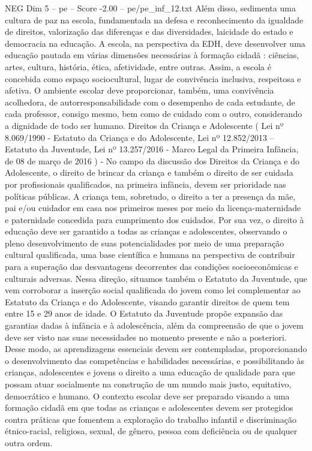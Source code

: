 \begin{textsample}{NEG Dim 5 – pe – Score -2.00 – pe/pe\_inf\_12.txt}
Além disso, sedimenta uma cultura de paz na escola, fundamentada na defesa e reconhecimento da igualdade de direitos, valorização das diferenças e das diversidades, laicidade do estado e democracia na educação.
A escola, na perspectiva da EDH, deve desenvolver uma educação pautada em várias dimensões necessárias à formação cidadã : ciências, artes, cultura, história, ética, afetividade, entre outras.
Assim, a escola é concebida como espaço sociocultural, lugar de convivência inclusiva, respeitosa e afetiva.
O ambiente escolar deve proporcionar, também, uma convivência acolhedora, de autorresponsabilidade com o desempenho de cada estudante, de cada professor, consigo mesmo, bem como de cuidado com o outro, considerando a dignidade de todo ser humano.
Direitos da Criança e Adolescente ( Lei nº 8.069/1990 - Estatuto da Criança e do Adolescente, Lei nº 12.852/2013 – Estatuto da Juventude, Lei nº 13.257/2016 - Marco Legal da Primeira Infância, de 08 de março de 2016 ) - No campo da discussão dos Direitos da Criança e do Adolescente, o direito de brincar da criança e também o direito de ser cuidada por profissionais qualificados, na primeira infância, devem ser prioridade nas políticas públicas.
A criança tem, sobretudo, o direito a ter a presença da mãe, pai e/ou cuidador em casa nos primeiros meses por meio da licença-maternidade e paternidade concedida para cumprimento dos cuidados.
Por sua vez, o direito à educação deve ser garantido a todas as crianças e adolescentes, observando o pleno desenvolvimento de suas potencialidades por meio de uma preparação cultural qualificada, uma base científica e humana na perspectiva de contribuir para a superação das desvantagens decorrentes das condições socioeconômicas e culturais adversas.
Nessa direção, situamos também o Estatuto da Juventude, que vem corroborar a inserção social qualificada do jovem como lei complementar ao Estatuto da Criança e do Adolescente, visando garantir direitos de quem tem entre 15 e 29 anos de idade.
O Estatuto da Juventude propõe expansão das garantias dadas à infância e à adolescência, além da compreensão de que o jovem deve ser visto nas suas necessidades no momento presente e não a posteriori.
Desse modo, as aprendizagens essenciais devem ser contempladas, proporcionando o desenvolvimento das competências e habilidades necessárias, e possibilitando às crianças, adolescentes e jovens o direito a uma educação de qualidade para que possam atuar socialmente na construção de um mundo mais justo, equitativo, democrático e humano.
O contexto escolar deve ser preparado visando a uma formação cidadã em que todas as crianças e adolescentes devem ser protegidos contra práticas que fomentem a exploração do trabalho infantil e discriminação étnico-racial, religiosa, sexual, de gênero, pessoa com deficiência ou de qualquer outra ordem.

\end{textsample}
